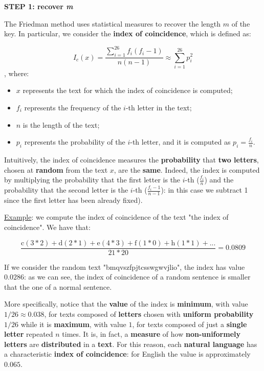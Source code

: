 \textbf{STEP 1: recover \textit{m}}

The Friedman method uses statistical measures to recover the length $m$ of the key. In particular, we consider the \textbf{index of coincidence}, which is defined as:

$$
I_c(x) = \frac{\sum_{i = 1}^{26} f_i (f_i - 1)}{n (n-1)} \approx \sum_{i = 1}^{26} p_i^2
$$
, where:

\begin{itemize}
    \item $x$ represents the text for which the index of coincidence is computed;
    \item $f_i$ represents the frequency of the $i$-th letter in the text;
    \item $n$ is the length of the text;
    \item $p_i$ represents the probability of the $i$-th letter, and it is computed as $p_i = \frac{f_i}{n}$.
\end{itemize}

Intuitively, the index of coincidence measures the \textbf{probability} that \textbf{two letters}, chosen at \textbf{random} from the text $x$, are the \textbf{same}. Indeed, the index is computed by multiplying the probability that the first letter is the $i$-th ($\frac{f_i}{n}$) and the probability that the second letter is the $i$-th ($\frac{f_i - 1}{n-1}$): in this case we subtract 1 since the first letter has been already fixed).

\underline{Example}: we compute the index of coincidence of the text "the index of coincidence". We have that:

$$
\frac{\text{c}(3 * 2) + \text{d}(2 * 1) + \text{e}(4 * 3) + \text{f}(1 * 0) + \text{h}(1 * 1) + ...}{21 * 20} = 0.0809
$$

If we consider the random text "bmqvszfpjtcsswgwvjlio", the index has value $0.0286$: as we can see, the index of coincidence of a random sentence is smaller that the one of a normal sentence. 

More specifically, notice that the \textbf{value} of the index is \textbf{minimum}, with value $1/26 \approx 0.038$, for texts composed of \textbf{letters} chosen with \textbf{uniform probability} $1/26$ while it is \textbf{maximum}, with value $1$, for texts composed of just a \textbf{single letter} repeated $n$ times. It is, in fact, a \textbf{measure} of how \textbf{non-uniformely letters} are \textbf{distributed} in a \textbf{text}. For this reason, each \textbf{natural language} has a characteristic \textbf{index of coincidence}: for English the value is approximately $0.065$. 

